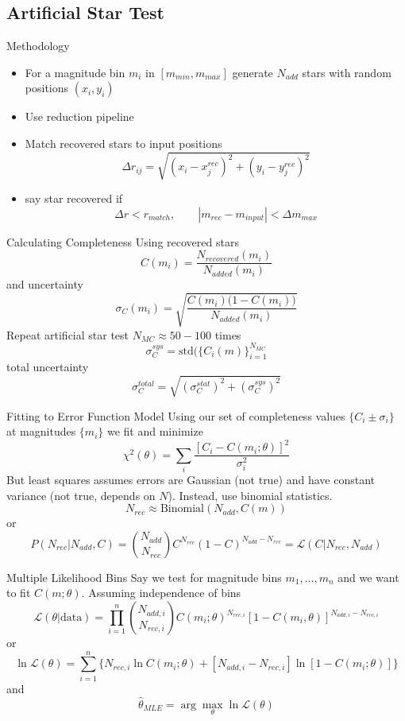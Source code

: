 \documentclass{beamer}
\begin{document}
\subsection{Artificial Star Test}
\begin{frame}{Methodology}
    \begin{itemize}
        \item For a magnitude bin $m_i$ in $[m_{min}, m_{max}]$ generate $N_{add}$ stars with random positions $(x_i,y_i)$ \cite{stetson1990}
        \item Use reduction pipeline
        \item Match recovered stars to input positions
        $$\Delta r_{ij} = \sqrt{(x_i-x_j^{rec})^2+(y_i-y_j^{rec})^2}$$
        \item say star recovered if
        $$\Delta r < r_{match}, \qquad |m_{rec}-m_{input}|<\Delta m_{max}$$
    \end{itemize}
\end{frame}
\begin{frame}{Calculating Completeness}
    Using recovered stars
    $$C(m_i) = \frac{N_{recovered}(m_i)}{N_{added}(m_i)}$$
    and uncertainty
    $$\sigma_C(m_i)=\sqrt{\frac{C(m_i)\big( 1 - C(m_i)\big)}{N_{added}(m_i)}}$$
    Repeat artificial star test $N_{MC}\approx 50-100$ times
    $$\sigma_C^{sys} = \mathrm{std}\big( \{ C_i(m)\}_{i=1}^{N_{MC}}$$
    total uncertainty
    $$\sigma_C^{total} = \sqrt{(\sigma_C^{stat})^2+(\sigma_C^{sys})^2}$$
\end{frame}
\begin{frame}{Fitting to Error Function Model}
    Using our set of completeness values $\{ C_i\pm \sigma_i\}$ at magnitudes $\{ m_i \}$ we fit and minimize
    $$\chi^2(\theta) = \sum_i \frac{[C_i-C(m_i; \theta)]^2}{\sigma_i^2}$$
    But least squares assumes errors are Gaussian (not true) and have constant variance (not true, depends on $N$). Instead, use binomial statistics. \cite{stetson1987,bertin1996}
    $$N_{rec} \approx \mathrm{Binomial}(N_{add},C(m))$$
    or
    $$P(N_{rec}|N_{add}, C) = {N_{add} \choose N_{rec}}C^{N_{rec}}(1-C)^{N_{add}-N_{rec}} = \mathcal{L}(C|N_{rec},N_{add})$$
\end{frame}
\begin{frame}{Multiple Likelihood Bins}
    Say we test for magnitude bins $m_1, \dots , m_n$ and we want to fit $C(m;\theta)$. Assuming independence of bins
    $$\mathcal{L}(\theta|\mathrm{data}) = \prod_{i=1}^n {N_{add,i} \choose N_{rec,i}}C(m_i;\theta)^{N_{rec,i}}[1-C(m_i,\theta)]^{N_{add,i}-N_{rec,i}}$$
    or
    $$\ln \mathcal{L}(\theta) = \sum_{i=1}^n \{ N_{rec,i}\ln C(m_i;\theta)+[N_{add,i}-N_{rec,i}]\ln [1-C(m_i;\theta)]\}$$
    and
    $$\hat{\theta}_{MLE} = \arg \max_\theta \ln \mathcal{L}(\theta)$$
\end{frame}
\end{document}
